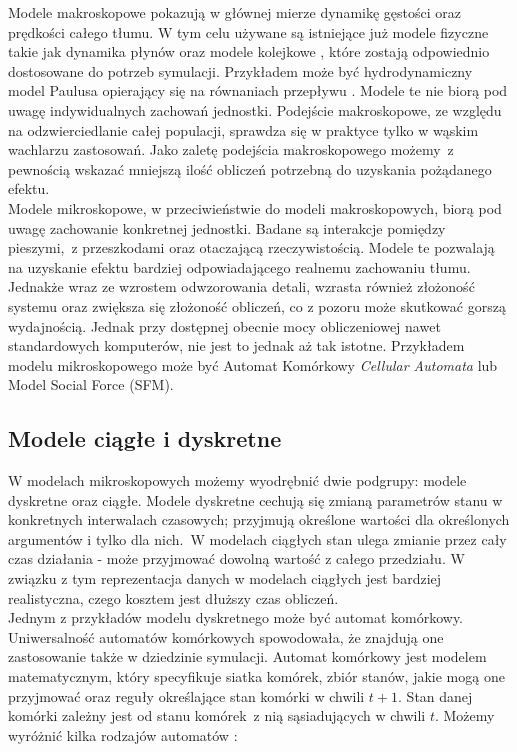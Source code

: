 Modele makroskopowe pokazują w głównej mierze dynamikę gęstości oraz prędkości całego tłumu. W tym celu używane są istniejące już modele fizyczne takie jak dynamika płynów oraz modele kolejkowe \cite{relativeVelocity}, które zostają odpowiednio dostosowane do potrzeb symulacji. Przykładem może być hydrodynamiczny model Paulusa opierający się na równaniach przepływu \cite{ArchitekturaModelowania}. Modele te nie biorą pod uwagę indywidualnych zachowań jednostki. Podejście makroskopowe, ze względu na odzwierciedlanie całej populacji, sprawdza się w praktyce tylko w wąskim wachlarzu zastosowań. Jako zaletę podejścia makroskopowego możemy~z pewnością wskazać mniejszą ilość obliczeń potrzebną do uzyskania pożądanego efektu. \\

Modele mikroskopowe, w przeciwieństwie do modeli makroskopowych, biorą pod uwagę zachowanie konkretnej jednostki. Badane są interakcje pomiędzy pieszymi,~z przeszkodami oraz otaczającą rzeczywistością. Modele te pozwalają na uzyskanie efektu bardziej odpowiadającego realnemu zachowaniu tłumu. Jednakże wraz ze wzrostem odwzorowania detali, wzrasta również złożoność systemu oraz zwiększa się złożoność obliczeń, co z pozoru może skutkować gorszą wydajnością. Jednak przy dostępnej obecnie mocy obliczeniowej nawet standardowych komputerów, nie jest to jednak aż tak istotne. Przykładem modelu mikroskopowego może być Automat Komórkowy \textit{Cellular Automata} lub Model Social Force (SFM). 

\subsection{Modele ciągłe i dyskretne}

W modelach mikroskopowych możemy wyodrębnić dwie podgrupy: modele dyskretne oraz ciągłe. Modele dyskretne cechują się zmianą parametrów stanu w konkretnych interwalach czasowych; przyjmują określone wartości dla określonych argumentów i tylko dla nich.~W modelach ciągłych stan ulega zmianie przez cały czas działania - może przyjmować dowolną wartość z całego przedziału. W związku z tym reprezentacja danych w modelach ciągłych jest bardziej realistyczna, czego kosztem jest dłuższy czas obliczeń. \\

Jednym z przykładów modelu dyskretnego może być automat komórkowy. Uniwersalność automatów komórkowych  spowodowała, że znajdują one zastosowanie także w dziedzinie symulacji. Automat komórkowy jest modelem matematycznym, który specyfikuje siatka komórek, zbiór stanów, jakie mogą one przyjmować oraz reguły określające stan komórki w chwili $t + 1$. Stan danej komórki zależny jest od stanu komórek~z nią sąsiadujących w chwili $t$. Możemy wyróżnić kilka rodzajów automatów \cite{modelowanieDynamikiTlumu}:

